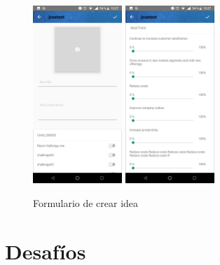 \begin{figure}[!h]
	\begin{center}
		\includegraphics[width=0.3\textwidth]{./img/anexo1/crear_idea.png}
		\includegraphics[width=0.3\textwidth]{./img/anexo1/crear_idea_cont.png}
		\caption{Formulario de crear idea}
		\label{fig:crear_idea}
	\end{center}
\end{figure}

\section{Desafíos}

